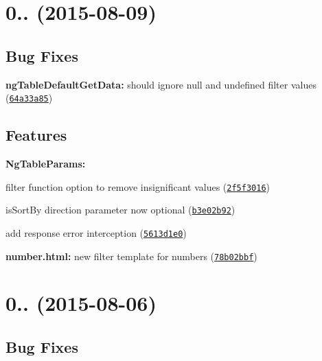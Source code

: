 \label{_0.8.3}%
 \section*{0.. (2015-\/08-\/09)}

\subsection*{Bug Fixes}


\begin{DoxyItemize}
\item {\bfseries ng\+Table\+Default\+Get\+Data\+:} should ignore null and undefined filter values (\href{https://github.com/esvit/ng-table/commit/64a33a8573e913ab38849534e7cbf85a286f245c}{\tt 64a33a85})
\end{DoxyItemize}

\subsection*{Features}


\begin{DoxyItemize}
\item {\bfseries Ng\+Table\+Params\+:}
\begin{DoxyItemize}
\item filter function option to remove insignificant values (\href{https://github.com/esvit/ng-table/commit/2f5f30161a9cdd2628b3e713fae922faa85db911}{\tt 2f5f3016})
\item is\+Sort\+By direction parameter now optional (\href{https://github.com/esvit/ng-table/commit/b3e02b922064a73e302ad08a2b6f90678dcc18dc}{\tt b3e02b92})
\item add response error interception (\href{https://github.com/esvit/ng-table/commit/5613d1e00cca6b8027686806a341a8b64e89a552}{\tt 5613d1e0})
\end{DoxyItemize}
\item {\bfseries number.\+html\+:} new filter template for numbers (\href{https://github.com/esvit/ng-table/commit/78b02bbfe4e00c395df70d9bef64ac0b20d01e4d}{\tt 78b02bbf})
\end{DoxyItemize}

\label{_0.8.2}%
 \section*{0.. (2015-\/08-\/06)}

\subsection*{Bug Fixes}


